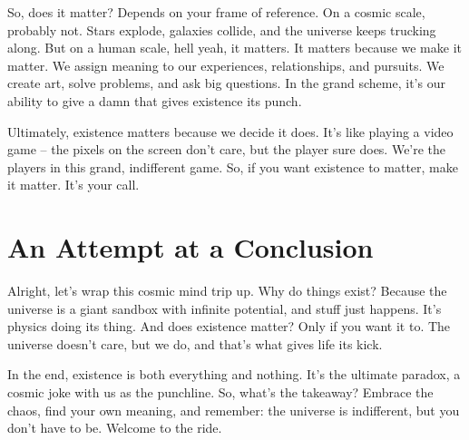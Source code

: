 \documentclass[twocolumn,final]{Axon}
\begin{document}
So, does it matter? Depends on your frame of reference. On a cosmic scale, probably not. Stars explode, galaxies collide, and the universe keeps trucking along. But on a human scale, hell yeah, it matters. It matters because we make it matter. We assign meaning to our experiences, relationships, and pursuits. We create art, solve problems, and ask big questions. In the grand scheme, it's our ability to give a damn that gives existence its punch.

Ultimately, existence matters because we decide it does. It’s like playing a video game – the pixels on the screen don’t care, but the player sure does. We’re the players in this grand, indifferent game. So, if you want existence to matter, make it matter. It's your call.

\section{An Attempt at a Conclusion}
Alright, let's wrap this cosmic mind trip up. Why do things exist? Because the universe is a giant sandbox with infinite potential, and stuff just happens. It’s physics doing its thing. And does existence matter? Only if you want it to. The universe doesn’t care, but we do, and that’s what gives life its kick.

In the end, existence is both everything and nothing. It’s the ultimate paradox, a cosmic joke with us as the punchline. So, what’s the takeaway? Embrace the chaos, find your own meaning, and remember: the universe is indifferent, but you don't have to be. Welcome to the ride. \cite{cosmicIndifference2024}

\printbibliography
\end{document}
